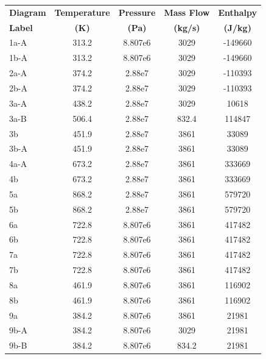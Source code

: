 \begin{paracol}{2}
\linenumbers
\switchcolumn

\begin{specialtable}[H] 
    \caption{State points calculated at steady state operation and LFR low temperature constrained to 673.2 K for C-LFR-ON cycle. \label{c-lfr-on-tab-cons}}
    \begin{tabular}{lcccc}
    \toprule
    \textbf{Diagram}	& \textbf{Temperature}	& \textbf{Pressure} &\textbf{Mass Flow} & \textbf{Enthalpy}\\
    \textbf{Label} & \textbf{(K)} & \textbf{(Pa)} &\textbf{(kg/s)} & \textbf{(J/kg)}\\
    \midrule
    1a-A		& 313.2  & 8.807e6  & 3029  & -149660\\
    1b-A		& 313.2  & 8.807e6  & 3029  & -149660\\
    2a-A		& 374.2  & 2.88e7  & 3029  & -110393\\
    2b-A		& 374.2  & 2.88e7  & 3029  & -110393\\
    3a-A		& 438.2  & 2.88e7  & 3029  & 10618\\
    3a-B		& 506.4  & 2.88e7  & 832.4  & 114847\\
    3b  		& 451.9  & 2.88e7  & 3861  & 33089\\
    3b-A		& 451.9  & 2.88e7  & 3861  & 33089\\
    4a-A		& 673.2  & 2.88e7  & 3861  & 333669\\
    4b  		& 673.2  & 2.88e7  & 3861  & 333669\\
    5a  		& 868.2  & 2.88e7  & 3861  & 579720\\
    5b  		& 868.2  & 2.88e7  & 3861  & 579720\\
    6a  		& 722.8  & 8.807e6  & 3861  & 417482\\
    6b  		& 722.8  & 8.807e6  & 3861  & 417482\\
    7a  		& 722.8  & 8.807e6  & 3861  & 417482\\
    7b  		& 722.8  & 8.807e6  & 3861  & 417482\\
    8a  		& 461.9  & 8.807e6  & 3861  & 116902\\
    8b  		& 461.9  & 8.807e6  & 3861  & 116902\\
    9a  		& 384.2  & 8.807e6  & 3861  & 21981\\
    9b-A		& 384.2  & 8.807e6  & 3029  & 21981\\
    9b-B		& 384.2  & 8.807e6  & 834.2  & 21981\\
    \bottomrule
    \end{tabular}

\end{specialtable}
\end{paracol}

